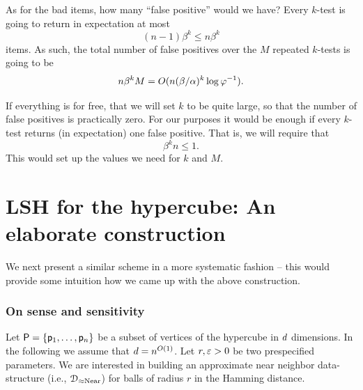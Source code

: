 As for the bad items, how many ``false positive'' would we have? Every
$k$-test is going to return in expectation at most
\begin{equation*}
    (n-1)\beta^k \leq n \beta^k
\end{equation*}
items. As such, the total number of false positives over the $M$
repeated $k$-tests is going to be
\begin{equation*}
    n \beta^k M = O(n (\beta/\alpha)^k \log \varphi^{-1}).
\end{equation*}

If everything is for free, that we will set $k$ to be quite large, so
that the number of false positives is practically zero. For our
purposes it would be enough if every $k$-test returns (in expectation)
one false positive. That is, we will require that
\begin{equation*}
    \beta^k n \leq 1.
\end{equation*}
This would set up the values we need for $k$ and $M$. 






\section{LSH for the hypercube: An elaborate construction}

We next present a similar scheme in a more systematic fashion -- this
would provide some intuition how we came up with the above
construction.

\subsubsection{On sense and sensitivity}

Let ${\mathsf{P}} = \left\{ {\mathsf{p}_1,\ldots, \mathsf{p}_n} \right\}$ be a subset of vertices of
the hypercube in $d$ dimensions. In the following we assume that
$d = n^{O(1)}$. Let $r,{\varepsilon}>0$ be two prespecified parameters. We
are interested in building an approximate near neighbor data-structure
(i.e., $\DSAprxNearNbr$) for balls of radius $r$ in the Hamming
distance.


